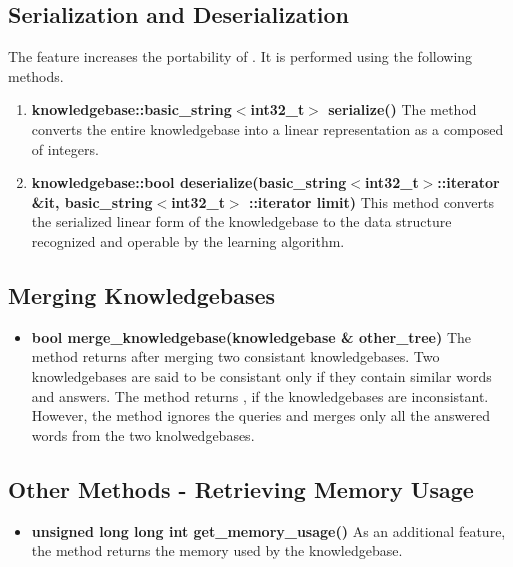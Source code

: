 \subsection*{Serialization and Deserialization}
The feature increases the portability of \libalf. It is performed using the following methods.
	
\begin{enumerate}
\item \textbf{knowledgebase::basic\_string$<$int32\_t$>$ serialize()} \vskip 1pt
The method converts the entire knowledgebase into a linear representation as a \stringtype composed of integers.

\item \textbf{knowledgebase::bool deserialize(basic\_string$<$int32\_t$>$::iterator \&it, basic\_string$<$int32\_t$>$ ::iterator limit)} \vskip 1pt
This method converts the serialized linear form of the knowledgebase to the data structure recognized and operable by the learning algorithm.
\end{enumerate}	
	
\subsection*{Merging Knowledgebases}

\begin{itemize}

  \item \textbf{bool merge\_knowledgebase(knowledgebase \& other\_tree)} \vskip 1pt
  The method returns \true after merging two consistant knowledgebases. Two knowledgebases are said to be consistant only if they contain similar words and answers. The method returns \false, if the knowledgebases are inconsistant.\\
  However, the method ignores the queries and merges only all the answered words from the two knolwedgebases.

\end{itemize}
 
\subsection*{Other Methods - Retrieving Memory Usage}

\begin{itemize}
  \item \textbf{unsigned long long int get\_memory\_usage()} \vskip 1pt
  As an additional feature, the method returns the memory used by the knowledgebase. 
\end{itemize}


